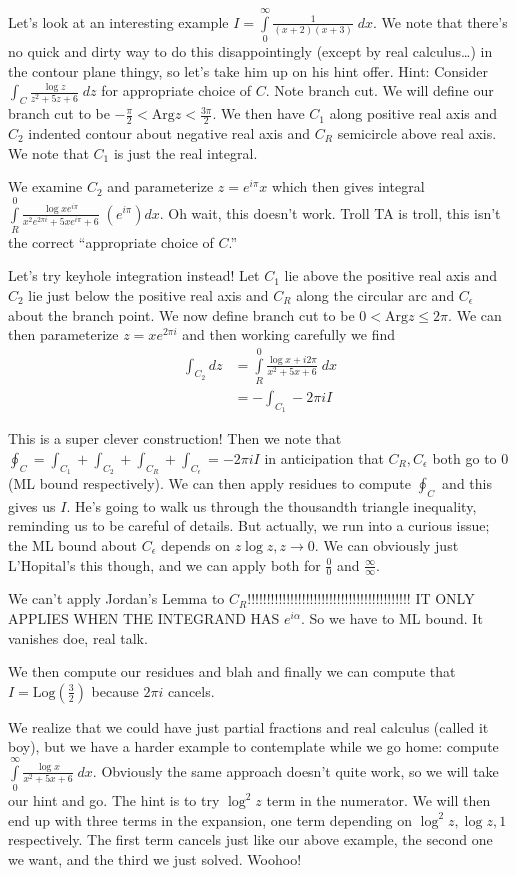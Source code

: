 \documentclass[10pt]{report}
\newcommand{\Log}[0]{\mathrm{Log} }
\newcommand{\Arg}[0]{\mathrm{Arg} }
\begin{document}
Let's look at an interesting example $I = \displaystyle\int\limits_{0}^{\infty}\frac{1}{(x+2)(x+3)}\;dx$. We note that there's no quick and dirty way to do this disappointingly (except by real calculus\dots) in the contour plane thingy, so let's take him up on his hint offer. Hint: Consider $\int_C \frac{\log z}{z^2 + 5z + 6}\; dz$ for appropriate choice of $C$. Note branch cut. We will define our branch cut to be $-\frac{\pi}{2} < \Arg z < \frac{3\pi}{2}$. We then have $C_1$ along positive real axis and $C_2$ indented contour about negative real axis and $C_R$ semicircle above real axis. We note that $C_1$ is just the real integral.

We examine $C_2$ and parameterize $z = e^{i\pi}x$ which then gives integral $\displaystyle\int\limits_{R}^{0}\frac{\log xe^{i\pi}}{x^2e^{2\pi i} + 5xe^{i\pi} + 6}\;(e^{i\pi})dx$. Oh wait, this doesn't work. Troll TA is troll, this isn't the correct ``appropriate choice of $C$.''

Let's try keyhole integration instead! Let $C_1$ lie above the positive real axis and $C_2$ lie just below the positive real axis and $C_R$ along the circular arc and $C_\epsilon$ about the branch point. We now define branch cut to be $0 < \Arg z \leq 2\pi$. We can then parameterize $z=xe^{2\pi i}$ and then working carefully we find
\begin{align*}
    \int_{C_2}dz &= \displaystyle\int\limits_{R}^{0}\frac{\log x + i2\pi}{x^2 + 5x + 6}\;dx\\
    &= -\int_{C_1} - 2\pi i I
\end{align*}

This is a super clever construction! Then we note that $\oint_C = \int_{C_1} + \int_{C_2} + \int_{C_R} + \int_{C_\epsilon} = -2\pi i I$ in anticipation that $C_R, C_\epsilon$ both go to $0$ (ML bound respectively). We can then apply residues to compute $\oint_C$ and this gives us $I$. He's going to walk us through the thousandth triangle inequality, reminding us to be careful of details. But actually, we run into a curious issue; the ML bound about $C_\epsilon$ depends on $z\log z, z \to 0$. We can obviously just L'Hopital's this though, and we can apply both for $\frac{0}{0}$ and $\frac{\infty}{\infty}$.

We can't apply Jordan's Lemma to $C_R$!!!!!!!!!!!!!!!!!!!!!!!!!!!!!!!!!!!!!!!!!! IT ONLY APPLIES WHEN THE INTEGRAND HAS $e^{i\alpha }$. So we have to ML bound. It vanishes doe, real talk.

We then compute our residues and blah and finally we can compute that $I = \Log(\frac{3}{2})$ because $2\pi i$ cancels.

We realize that we could have just partial fractions and real calculus (called it boy), but we have a harder example to contemplate while we go home: compute $\displaystyle\int\limits_{0}^{\infty}\frac{\log x}{x^2 + 5x + 6}\;dx$. Obviously the same approach doesn't quite work, so we will take our hint and go. The hint is to try $\log^2 z$ term in the numerator. We will then end up with three terms in the expansion, one term depending on $\log^2z, \log z, 1$ respectively. The first term cancels just like our above example, the second one we want, and the third we just solved. Woohoo!
\end{document}
